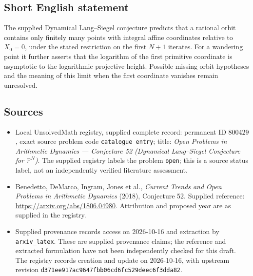 \documentclass[11pt]{article}
\begin{document}
\subsection{Short English statement}
The supplied Dynamical Lang--Siegel conjecture predicts that a rational orbit contains only finitely many points with integral affine coordinates relative to \(X_0=0\), under the stated restriction on the first \(N+1\) iterates. For a wandering point it further asserts that the logarithm of the first primitive coordinate is asymptotic to the logarithmic projective height. Possible missing orbit hypotheses and the meaning of this limit when the first coordinate vanishes remain unresolved.
\subsection{Sources}
\begin{itemize}
\item Local UnsolvedMath registry, supplied complete record: permanent ID \(800429\), exact source problem code \texttt{catalogue entry}; title: \emph{Open Problems in Arithmetic Dynamics --- Conjecture 52 (Dynamical Lang--Siegel Conjecture for \(\mathbb{P}^N\))}. The supplied registry labels the problem \texttt{open}; this is a source status label, not an independently verified literature assessment.
\item Benedetto, DeMarco, Ingram, Jones et al., \emph{Current Trends and Open Problems in Arithmetic Dynamics} (2018), Conjecture 52. Supplied reference: \url{https://arxiv.org/abs/1806.04980}. Attribution and proposed year are as supplied in the registry.
\item Supplied provenance records access on 2026-10-16 and extraction by \texttt{arxiv\_latex}. These are supplied provenance claims; the reference and extracted formulation have not been independently checked for this draft. The registry records creation and update on 2026-10-16, with upstream revision \texttt{d371ee917ac9647fbb06cd6fc529deec6f3dda82}.
\end{itemize}
\end{document}
